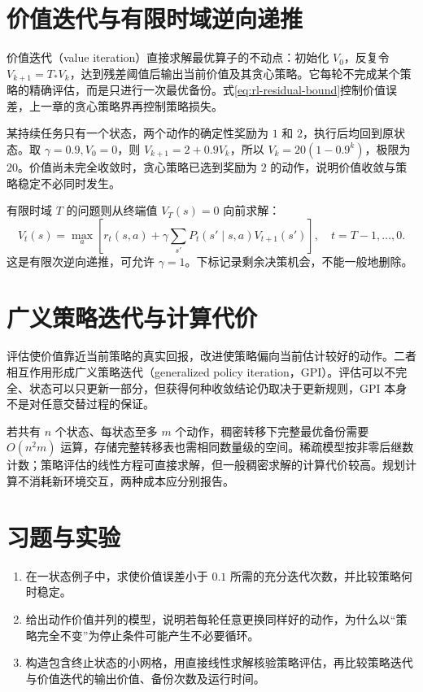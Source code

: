 \section{价值迭代与有限时域逆向递推}

价值迭代（value iteration）直接求解最优算子的不动点：初始化 $V_0$，反复令 $V_{k+1}=T_*V_k$，达到残差阈值后输出当前价值及其贪心策略。它每轮不完成某个策略的精确评估，而是只进行一次最优备份。式\eqref{eq:rl-residual-bound}控制价值误差，上一章的贪心策略界再控制策略损失。

\begin{example}[一状态价值迭代]
某持续任务只有一个状态，两个动作的确定性奖励为 $1$ 和 $2$，执行后均回到原状态。取 $\gamma=0.9,V_0=0$，则 $V_{k+1}=2+0.9V_k$，所以 $V_k=20(1-0.9^k)$，极限为 $20$。价值尚未完全收敛时，贪心策略已选到奖励为 $2$ 的动作，说明价值收敛与策略稳定不必同时发生。
\end{example}

有限时域 $T$ 的问题则从终端值 $V_T(s)=0$ 向前求解：
\[
V_t(s)=\max_a\left[r_t(s,a)+\gamma\sum_{s'}P_t(s'\mid s,a)V_{t+1}(s')\right],\quad t=T-1,\ldots,0.
\]
这是有限次逆向递推，可允许 $\gamma=1$。下标记录剩余决策机会，不能一般地删除。

\section{广义策略迭代与计算代价}

评估使价值靠近当前策略的真实回报，改进使策略偏向当前估计较好的动作。二者相互作用形成广义策略迭代（generalized policy iteration，GPI）。评估可以不完全、状态可以只更新一部分，但获得何种收敛结论仍取决于更新规则，GPI 本身不是对任意交替过程的保证。

若共有 $n$ 个状态、每状态至多 $m$ 个动作，稠密转移下完整最优备份需要 $O(n^2m)$ 运算，存储完整转移表也需相同数量级的空间。稀疏模型按非零后继数计数；策略评估的线性方程可直接求解，但一般稠密求解的计算代价较高。规划计算不消耗新环境交互，两种成本应分别报告。

\section{习题与实验}
\begin{enumerate}
\item 在一状态例子中，求使价值误差小于 $0.1$ 所需的充分迭代次数，并比较策略何时稳定。
\item 给出动作价值并列的模型，说明若每轮任意更换同样好的动作，为什么以“策略完全不变”为停止条件可能产生不必要循环。
\item 构造包含终止状态的小网格，用直接线性求解核验策略评估，再比较策略迭代与价值迭代的输出价值、备份次数及运行时间。
\end{enumerate}





